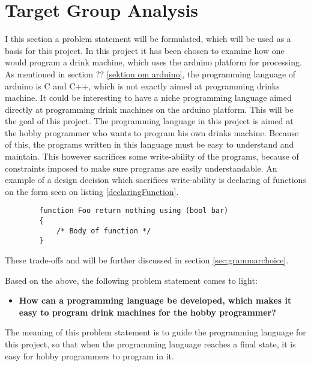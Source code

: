 \section{Target Group Analysis}
I  this section a problem statement will be formulated, which will be used as a basis for this project. In this project it has been chosen to examine how one would program a drink machine, which uses the arduino platform for processing. As mentioned in section ?? \ref{sektion om arduino}, the programming language of arduino is C and C++, which is not exactly aimed at programming drinks machine. It could be interesting to have a niche programming language aimed directly at programming drink machines on the arduino platform. This will be the goal of this project. The programming language in this project is aimed at the hobby programmer who wants to program his own drinks machine. Because of this, the programs written in this language must be easy to understand and maintain. This however sacrifices some write-ability of the programs, because of constraints imposed to make sure programs are easily understandable. An example of a design decision which sacrifices write-ability is declaring of functions on the form seen on listing \ref{declaringFunction}.

\begin{code}
	\begin{lstlisting}
		function Foo return nothing using (bool bar)
		{
			/* Body of function */
		}
	\end{lstlisting}
\end{code}
These trade-offs and will be further discussed in section \ref{sec:grammarchoice}.

Based on the above, the following problem statement comes to light:
\begin{itemize}
	\item \textbf{How can a programming language be developed, which makes it easy to program drink machines for the hobby programmer?}
\end{itemize}
The meaning of this problem statement is to guide the programming language for this project, so that when the programming language reaches a final state, it is easy for hobby programmers to program in it. 

